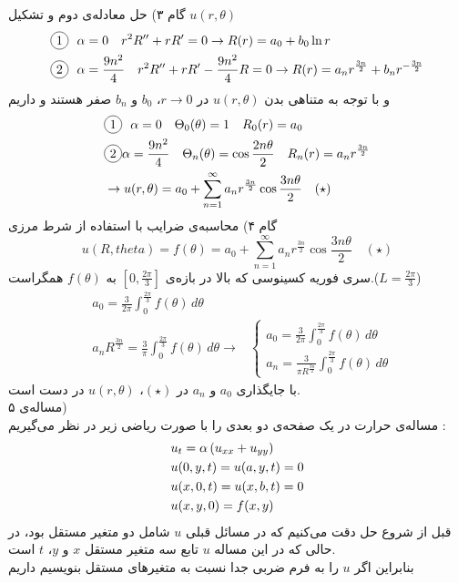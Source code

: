 گام ۳) حل معادله‌ی دوم و تشکیل
$u(r,\theta)$
\[\begin{aligned}
	& \circled1 \ \ \alpha=0 \quad r^2R^{\prime\prime}+rR^\prime=0\rightarrow R(r)=a_0+b_0\ln r
	\\ &
	\circled2 \ \ \alpha=\frac{9n^2}4\quad r^2R^{\prime\prime}+rR^\prime-\frac{9n^2}4R=0\rightarrow R(r)=a_nr^{\frac{3n}2}+b_nr^{-\frac{3n}2}
\end{aligned}\]
و با توجه به متناهی بدن
$u(r,\theta)$
در
$r\to0$،
$b_0$
و
$b_n$
صفر هستند و داریم
\[\begin{aligned}
	& \circled1 \ \ \alpha=0 \quad \Theta_0(\theta)=1\quad R_0(r)=a_0
	\\ &
	\circled2 \alpha=\frac{9n^2}4\quad \Theta_n(\theta)=\cos\frac{2n\theta}2 \quad R_n(r)=a_nr^\frac{3n}2
	\\ &
	\rightarrow u(r,\theta)=a_0+\sum_{n=1}^\infty a_nr^\frac{3n}2\cos\frac{3n\theta}2 \quad (\star)
\end{aligned}\]
گام ۴) محاسبه‌ی ضرایب با استفاده از شرط مرزی
\[
u(R,theta)=f(\theta)=a_0+\sum_{n=1}^\infty a_nr^\frac{3n}2\cos\frac{3n\theta}2 \quad (\star)
\]
سری فوریه کسینوسی که بالا در بازه‌ی
$\left[0,\frac{2\pi}3\right]$
به
$f(\theta)$
همگراست.($L=\frac{2\pi}3$)
\[\begin{aligned}
	&a_0=\frac3{2\pi}\int_0^\frac{2\pi}3 f(\theta)\,d\theta
	\\ &
	a_nR^\frac{3n}2=\frac3\pi\int_0^\frac{2\pi}3f(\theta)\,d\theta
	\rightarrow & \begin{cases}
		a_0=\frac3{2\pi}\int_0^\frac{2\pi}3 f(\theta)\,d\theta
		\\
		a_n=\frac3{\pi R^\frac{3n}2}\int_0^\frac{2\pi}3f(\theta)\,d\theta
	\end{cases}
\end{aligned}\]
با جایگذاری
$a_0$
و
$a_n$
در
$(\star)$،
$u(r,\theta)$
در دست است.\\
مساله‌ی ۵)\\
مساله‌ی حرارت در یک صفحه‌ی دو بعدی را با صورت ریاضی زیر در نظر می‌گیریم :
\[\begin{aligned}
	& u_t=\alpha\left(u_{xx}+u_{yy}\right)
	\\ &
	u(0,y,t)=u(a,y,t)=0
	\\ &
	u(x,0,t)=u(x,b,t)=0
	\\ &
	u(x,y,0)=f(x,y)
\end{aligned}\]
قبل از شروع حل دقت می‌کنیم که در مسائل قبلی
$u$
شامل دو متغیر مستقل بود، در حالی که در این مساله
$u$
تابع سه متغیر مستقل
$x$
و
$y$،
$t$
است.\\
بنابراین اگر
$u$
را به فرم ضربی جدا نسبت به متغیرهای مستقل بنویسیم داریم
